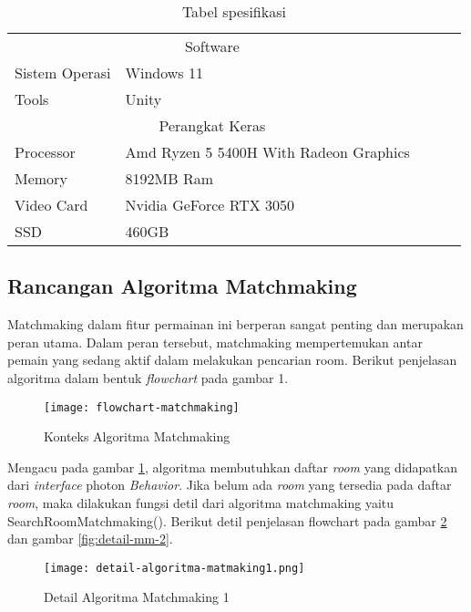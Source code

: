     \begin{table}[h]
        \centering
        \caption{Tabel spesifikasi}
	\label{tb:tabel-spesifikasi}
        \begin{tabular}{|ll|lll}
        \cline{1-2}
        \multicolumn{2}{|c|}{Software}                                                &  &  &  \\ \cline{1-2}
        \multicolumn{1}{|l|}{Sistem Operasi} & Windows 11                             &  &  &  \\ \cline{1-2}
        \multicolumn{1}{|l|}{Tools}          & Unity                                  &  &  &  \\ \cline{1-2}
        \multicolumn{2}{|c|}{Perangkat Keras}                                         &  &  &  \\ \cline{1-2}
        \multicolumn{1}{|l|}{Processor}      & Amd Ryzen 5 5400H With Radeon Graphics &  &  &  \\ \cline{1-2}
        \multicolumn{1}{|l|}{Memory}         & 8192MB Ram                             &  &  &  \\ \cline{1-2}
        \multicolumn{1}{|l|}{Video Card}     & Nvidia GeForce RTX 3050                &  &  &  \\ \cline{1-2}
        \multicolumn{1}{|l|}{SSD}            & 460GB                                  &  &  &  \\ \cline{1-2}
        \end{tabular}
        \end{table}
\subsection{Rancangan Algoritma Matchmaking}
Matchmaking dalam fitur permainan ini berperan sangat penting dan merupakan peran utama. Dalam peran tersebut, matchmaking mempertemukan antar pemain yang sedang aktif dalam melakukan pencarian room. Berikut penjelasan algoritma dalam bentuk \textit{flowchart} pada gambar 1.
\begin{figure}[h]
    \centering
    \caption{Konteks  Algoritma Matchmaking}
    \texttt{[image: flowchart-matchmaking]}
    \label{fig:algoritmamatmaching}
    \end{figure}


    Mengacu pada gambar \ref{fig:algoritmamatmaching}, algoritma membutuhkan daftar \textit{room} yang didapatkan dari \textit{interface} photon \textit{Behavior}. Jika belum ada \textit{room} yang tersedia pada daftar \textit{room}, maka dilakukan fungsi detil dari algoritma matchmaking yaitu SearchRoomMatchmaking(). Berikut detil penjelasan flowchart pada gambar \ref{fig:detail-mm-1} dan gambar \ref{fig:detail-mm-2}.
    \newpage
    \begin{figure}[h]
        \centering
        \caption{Detail Algoritma Matchmaking 1}
        \texttt{[image: detail-algoritma-matmaking1.png]}
        \label{fig:detail-mm-1}
        \end{figure}


